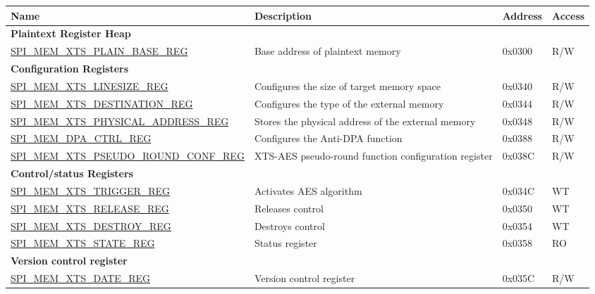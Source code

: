 \begin{longtable}{ | p{8cm} | p{5cm} | p{1.3cm} | p{1cm} |}
\hline\rowcolor{lightgray}
\textbf{Name} & \textbf{Description} & \textbf{Address} & \textbf{Access} \\ \hline
\endhead

\multicolumn{4}{|l|}{\textbf{Plaintext Register Heap}} \\\hline
\hyperref[regdesc:SPIMEMXTSPLAINBASEREG]{SPI\_MEM\_XTS\_PLAIN\_BASE\_REG}  & Base address of plaintext memory   & 0x0300 & R/W \\\hline
\multicolumn{4}{|l|}{\textbf{Configuration Registers}} \\ \hline
\hyperref[regdesc:SPIMEMXTSLINESIZEREG]{SPI\_MEM\_XTS\_LINESIZE\_REG} & Configures the size of target memory space & 0x0340 & R/W \\ \hline
\hyperref[regdesc:SPIMEMXTSDESTINATIONREG]{SPI\_MEM\_XTS\_DESTINATION\_REG} & Configures the type of the external memory & 0x0344 & R/W \\ \hline
\hyperref[regdesc:SPIMEMXTSPHYSICALADDRESSREG]{SPI\_MEM\_XTS\_PHYSICAL\_ADDRESS\_REG} & Stores the physical address of the external memory & 0x0348 & R/W \\ \hline
\hyperref[regdesc:SPIMEMDPACTRLREG]{SPI\_MEM\_DPA\_CTRL\_REG}  & Configures the Anti-DPA function       & 0x0388 & R/W \\\hline
\hyperref[regdesc:SPIMEMXTSPSEUDOROUNDCONFREG]{SPI\_MEM\_XTS\_PSEUDO\_ROUND\_CONF\_REG} & XTS-AES pseudo-round function configuration register & 0x038C & R/W \\ \hline
\multicolumn{4}{|l|}{\textbf{Control/status Registers}} \\ \hline
\hyperref[regdesc:SPIMEMXTSTRIGGERREG]{SPI\_MEM\_XTS\_TRIGGER\_REG} & Activates AES algorithm & 0x034C & WT \\ \hline
\hyperref[regdesc:SPIMEMXTSRELEASEREG]{SPI\_MEM\_XTS\_RELEASE\_REG} & Releases control & 0x0350 & WT \\ \hline
\hyperref[regdesc:SPIMEMXTSDESTROYREG]{SPI\_MEM\_XTS\_DESTROY\_REG} & Destroys control & 0x0354 & WT \\ \hline
\hyperref[regdesc:SPIMEMXTSSTATEREG]{SPI\_MEM\_XTS\_STATE\_REG} & Status register & 0x0358 & RO \\ \hline
\multicolumn{4}{|l|}{\textbf{Version control register}} \\ \hline
\hyperref[regdesc:SPIMEMXTSDATEREG]{SPI\_MEM\_XTS\_DATE\_REG} & Version control register & 0x035C & R/W \\ \hline
\end{longtable}
